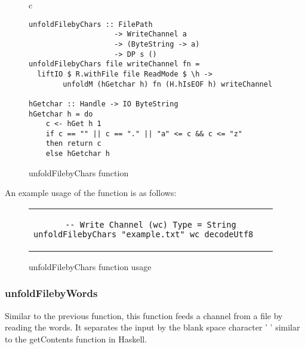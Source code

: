 \begin{figure}[H]
    \begin{tabular}{c}
        \begin{lstlisting}
unfoldFilebyChars :: FilePath 
                    -> WriteChannel a 
                    -> (ByteString -> a) 
                    -> DP s ()
unfoldFilebyChars file writeChannel fn =
  liftIO $ R.withFile file ReadMode $ \h -> 
        unfoldM (hGetchar h) fn (H.hIsEOF h) writeChannel

hGetchar :: Handle -> IO ByteString
hGetchar h = do
    c <- hGet h 1
    if c == "" || c == "." || "a" <= c && c <= "z" 
    then return c 
    else hGetchar h
        \end{lstlisting}
    \end{tabular}
    \caption[{[Code]} unfoldFilebyChars definition]{unfoldFilebyChars function}
    \label{fig:HC21}
\end{figure}

An example usage of the function is as follows:

\begin{figure}[H]
    \begin{tabular}{c}
        \begin{lstlisting}
-- Write Channel (wc) Type = String
unfoldFilebyChars "example.txt" wc decodeUtf8	
        \end{lstlisting}
    \end{tabular}
    \caption[{[Code]} unfoldFilebyChars example]{unfoldFilebyChars function usage}
    \label{fig:HC21b}
\end{figure}

\subsubsection*{unfoldFilebyWords}
Similar to the previous function, this function feeds a channel from a file by reading the words.
It separates the input by the blank space character ' ' similar to the getContents function in Haskell. \\

